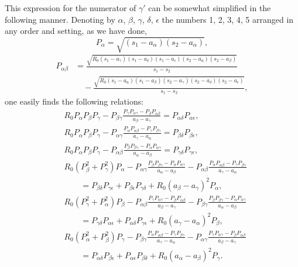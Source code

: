 \documentclass{article}
\begin{document}
This expression for the numerator of $\gamma'$ can be somewhat simplified in the following manner.
Denoting by $\alpha$, $\beta$, $\gamma$, $\delta$, $\epsilon$ the numbers 1, 2, 3, 4, 5 arranged in any order and setting, as we have done,
\[
P_\alpha = \sqrt{(s_1 - a_\alpha)(s_2 - a_\alpha)},
\]
\begin{align*}
P_{\alpha\beta} &= \frac{\sqrt{R_0(s_1 - a_\gamma)(s_1 - a_\delta)(s_1 - a_\epsilon)(s_2 - a_a)(s_2 - a_\beta)}}{s_1 - s_2} \\
&\quad - \frac{\sqrt{R_0(s_1 - a_a)(s_1 - a_\beta)(s_2 - a_\gamma)(s_2 - a_\delta)(s_2 - a_\epsilon)}}{s_1 - s_2},
\end{align*}
one easily finds the following relations:
\begin{align*}
&R_0P_\alpha P_\beta P_\gamma - P_{\beta\gamma}\frac{P_\gamma P_{\alpha\gamma} - P_\beta P_{\alpha\beta}}{a_\beta - a_\gamma} = P_{\alpha\delta}P_{\alpha\epsilon}, \\
&R_0P_\alpha P_\beta P_\gamma - P_{\alpha\gamma}\frac{P_\alpha P_{\alpha\beta} - P_\gamma P_{\beta\gamma}}{a_\gamma - a_\alpha} = P_{\beta\delta}P_{\beta\epsilon}, \\
&R_0P_\alpha P_\beta P_\gamma - P_{\alpha\beta}\frac{P_\beta P_{\beta\gamma} - P_\alpha P_{\alpha\gamma}}{a_\alpha - a_\beta} = P_{\gamma\delta}P_{\gamma\epsilon}, \\
&R_0(P_\beta^2 + P_\gamma^2)P_\alpha - P_{\alpha\gamma}\frac{P_\beta P_{\beta\gamma} - P_\alpha P_{\alpha\gamma}}{a_\alpha - a_\beta} - P_{\alpha\beta}\frac{P_\alpha P_{\alpha\beta} - P_\gamma P_{\beta\gamma}}{a_\gamma - a_\alpha} \\
&\qquad = P_{\beta\delta}P_{\gamma\epsilon} + P_{\beta\epsilon}P_{\gamma\delta} + R_0(a_\beta - a_\gamma)^2P_\alpha, \\
&R_0(P_\gamma^2 + P_\alpha^2)P_\beta - P_{\alpha\beta}\frac{P_\gamma P_{\alpha\gamma} - P_\beta P_{\alpha\beta}}{a_\beta - a_\gamma} - P_{\beta\gamma}\frac{P_\beta P_{\beta\gamma} - P_\alpha P_{\alpha\gamma}}{a_\alpha - a_\beta} \\
&\qquad = P_{\gamma\delta}P_{\alpha\epsilon} + P_{\alpha\delta}P_{\gamma\epsilon} + R_0(a_\gamma - a_\alpha)^2P_\beta, \\
&R_0(P_\alpha^2 + P_\beta^2)P_\gamma - P_{\beta\gamma}\frac{P_\alpha P_{\alpha\beta} - P_\gamma P_{\beta\gamma}}{a_\gamma - a_\alpha} - P_{\alpha\gamma}\frac{P_\gamma P_{\alpha\gamma} - P_\beta P_{\alpha\beta}}{a_\beta - a_\gamma} \\
&\qquad = P_{\alpha\delta}P_{\beta\epsilon} + P_{\alpha\epsilon}P_{\beta\delta} + R_0(a_\alpha - a_\beta)^2P_\gamma.
\end{align*}
\end{document}
